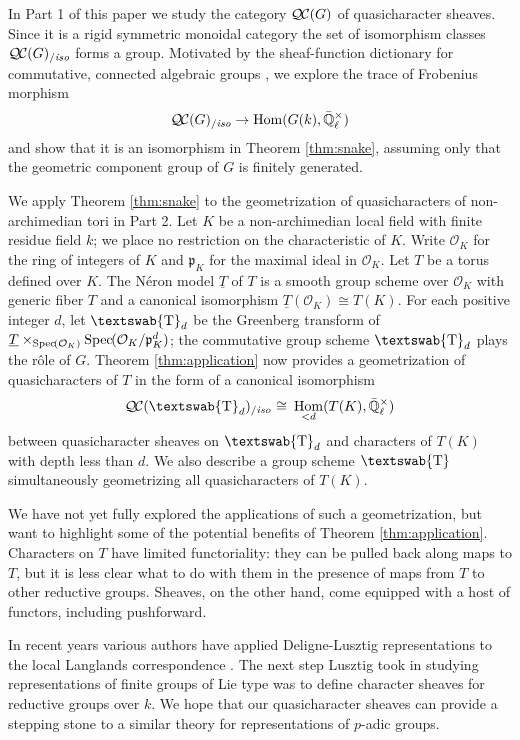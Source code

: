 \documentclass[11pt]{amsart}
\newcommand{\mathswab}[1]{\operatorname{\textswab{#1}}}
\theoremstyle{plain}
\theoremstyle{definition}
\theoremstyle{remark}
\newcommand{\Spec}[1]{{\operatorname{Spec}\hskip-1pt( #1 )}}
\newcommand{\EE}{\mathbb{\bar Q}_\ell}
\newcommand{\OK}{\mathcal{O}_K}
\newcommand{\pK}{\mathfrak{p}_K}
\newcommand{\Fq}{k}
\newcommand{\EEx}{\EE^\times}
\DeclareMathOperator{\Hom}{Hom}
\newcommand{\iso}{{\ \cong\ }}
\newcommand{\GN}[1]{\mathswab{#1}}
\newcommand{\TT}{\underline{T}}
\newcommand{\QC}{{\mathcal{Q\hskip-0.8pt C}}}
\newcommand{\QCiso}[1]{\QC(#1)_{/\textit{iso}}}
\begin{document}
In Part 1 of this paper we study the category $\QC(G)$ of quasicharacter sheaves.
Since it is a rigid symmetric monoidal category
the set of isomorphism classes $\QCiso{G}$ forms a group.
Motivated by the sheaf-function dictionary for commutative, connected
algebraic groups \cite{deligne:SGA4.5}, we explore the trace of Frobenius morphism
\[
\QCiso{G} \to \Hom(G(\Fq), \EEx)
\]
and show that it is an isomorphism in Theorem \ref{thm:snake}, assuming only
that the geometric component group of $G$ is finitely generated.

We apply Theorem \ref{thm:snake} to the geometrization of quasicharacters
of non-archimedian tori in Part 2.  Let $K$ be a non-archimedian local field
with finite residue field $\Fq$; we place no restriction on the characteristic of $K$.
Write $\OK$ for the ring of integers of $K$ and $\pK$ for the maximal ideal in $\OK$.
Let $T$ be a torus defined over $K$.  The N\'eron model $\TT$ of $T$
is a smooth group scheme over $\OK$ with generic fiber $T$ and a canonical isomorphism
$\TT(\OK) \cong T(K)$.  For each positive integer $d$, let $\GN{T}_d$ be the
Greenberg transform of $\TT \times_{\Spec{\OK}} \Spec{\OK/\pK^d}$; the commutative
group scheme $\GN{T}_d$ plays the r\^{o}le of $G$.  Theorem \ref{thm:application}
now provides a geometrization of quasicharacters of $T$ in the form of a canonical isomorphism
\[
\QCiso{\GN{T}_d} 
\iso
\Hom_{< d}(T(K),\EEx)
\] 
between quasicharacter sheaves on $\GN{T}_d$ and characters of $T(K)$ with depth less than $d$.
We also describe a group scheme $\GN{T}$ simultaneously geometrizing all quasicharacters of $T(K)$.

We have not yet fully explored the applications of such a geometrization, but want to highlight
some of the potential benefits of Theorem \ref{thm:application}.  Characters on $T$ have limited
functoriality: they can be pulled back along maps to $T$, but it is less clear what to do with them
in the presence of maps from $T$ to other reductive groups.  Sheaves, on the other hand, come
equipped with a host of functors, including pushforward.  

In recent years various authors have applied Deligne-Lusztig representations to the
local Langlands correspondence \cite{}.  The next step Lusztig took in studying representations
of finite groups of Lie type was to define character sheaves for reductive groups over $\Fq$.
We hope that our quasicharacter sheaves can provide a stepping stone to a similar theory for
representations of $p$-adic groups.
\end{document}
